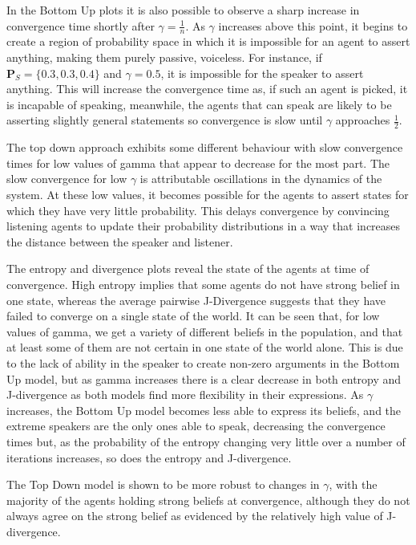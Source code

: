 In the Bottom Up plots it is also possible to observe a sharp increase in convergence time shortly after $ \gamma = \frac{1}{n}$. As $\gamma$ increases above this point, it begins to create a region of probability space in which it is impossible for an agent to assert anything, making them purely passive, voiceless. For instance, if $\mathbf{P}_S =\{ 0.3, 0.3, 0.4\}$ and $\gamma = 0.5$, it is impossible for the speaker to assert anything. This will increase the convergence time as, if such an agent is picked, it is incapable of speaking, meanwhile, the agents that can speak are likely to be asserting slightly general statements so convergence is slow until $\gamma$ approaches $\frac{1}{2}$. 

The top down approach exhibits some different behaviour with slow convergence times for low values of gamma that appear to decrease for the most part. The slow convergence for low $\gamma$ is attributable oscillations in the dynamics of the system. At these low values, it becomes possible for the agents to assert states for which they have very little probability. This delays convergence by convincing listening agents to update their probability distributions in a way that increases the distance between the speaker and listener. 

The entropy and divergence plots reveal the state of the agents at time of convergence. High entropy implies that some agents do not have strong belief in one state, whereas the average pairwise J-Divergence suggests that they have failed to converge on a single state of the world. It can be seen that, for low values of gamma, we get a variety of different beliefs in the population, and that at least some of them are not certain in one state of the world alone. This is due to the lack of ability in the speaker to create non-zero arguments in the Bottom Up model, but as gamma increases there is a clear decrease in both entropy and J-divergence as both models find more flexibility in their expressions. As $\gamma$ increases, the Bottom Up model becomes less able to express its beliefs, and the extreme speakers are the only ones able to speak, decreasing the convergence times but, as the probability of the entropy changing very little over a number of iterations increases, so does the entropy and J-divergence. 

The Top Down model is shown to be more robust to changes in $\gamma$, with the majority of the agents holding strong beliefs at convergence, although they do not always agree on the strong belief as evidenced by the relatively high value of J-divergence. 

